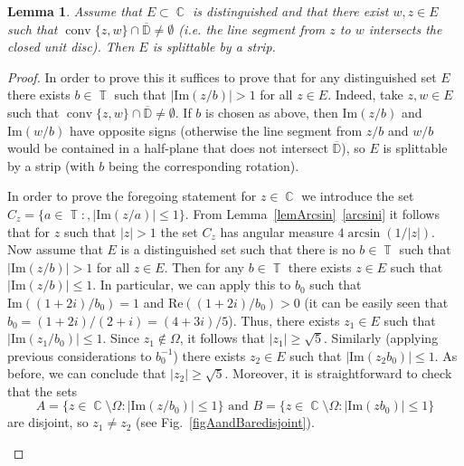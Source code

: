 \documentclass{amsart}
\numberwithin{equation}{section}
\newtheorem{lemma}[theorem]{Lemma}
\theoremstyle{definition}
\theoremstyle{remark}
\DeclareMathOperator{\conv}{conv}
\DeclareMathOperator{\CC}{\mathbb C}
\DeclareMathOperator{\TT}{\mathbb T}
\begin{document}
	\begin{lemma}\label{lemIfNotAsteriskThenNoOppositeStrips}
		Assume that $E \subset \CC$ is distinguished and that there exist $w,z \in E$ such that $\conv\{z, w\} \cap \overline{\mathbb D} \ne \emptyset$ (i.e. the line segment from $z$ to $w$ intersects the closed unit disc). Then $E$ is splittable by a strip.
	\end{lemma}
	\begin{proof}
		In order to prove this it suffices to prove that for any distinguished set $E$ there exists $b \in \TT$ such that $|\mathrm{Im}(z/b)| > 1$ for all $z \in E$.
		Indeed, take $z,w \in E$ such that $\conv\{z, w\} \cap \overline{\mathbb D} \ne \emptyset$. If $b$ is chosen as above, then $ \mathrm{Im}(z/b)$ and $\mathrm{Im}(w/b)$ have opposite signs (otherwise the line segment from $z/b$ and $w/b$ would be contained in a half-plane that does not intersect $\overline{\mathbb D}$), so $E$ is splittable by a strip (with $b$ being the corresponding rotation).
		
		In order to prove the foregoing statement for $z \in \CC$ we introduce the set $C_z = \{a \in \TT:, |\mathrm{Im}(z/a)| \le 1\}$. From Lemma~\ref{lemArcsin}~\ref{arcsini} it follows that for $z$ such that $|z| > 1$ the set $C_z$ has angular measure $4\arcsin(1/|z|)$. Now assume that $E$ is a distinguished set such that there is no $b \in \TT$ such that  $|\mathrm{Im}(z/b)| > 1$ for all $z \in E$. Then for any $b \in \TT$ there exists $z \in E$ such that $|\mathrm{Im}(z/b)| \le 1$. In particular, we can apply this to $b_0$ such that $\mathrm{Im}((1 + 2i)/b_0) = 1$ and $\mathrm{Re}((1 + 2i)/b_0) > 0$ (it can be easily seen that $b_0 = (1 + 2i)/(2 + i) = (4 + 3i)/5$). Thus, there exists $z_1 \in E$ such that $|\mathrm{Im}(z_1/b_0)| \le 1$. Since $z_1 \notin \Omega$, it follows that $|z_1| \ge \sqrt{5}$. Similarly (applying previous considerations to $b_0^{-1}$) there exists $z_2 \in E$ such that $|\mathrm{Im}(z_2b_0)| \le 1$. As before, we can conclude that $|z_2| \ge \sqrt{5}$. Moreover, it is straightforward to check that the sets
		\begin{equation}\label{eqAandB}
		A  = \{z \in \CC \setminus \Omega: |\mathrm{Im}(z/b_0)| \le 1\} \text{ and } B  = \{z \in \CC \setminus \Omega: |\mathrm{Im}(zb_0)| \le 1\} 
		\end{equation}
		are disjoint, so $z_1 \ne z_2$ (see Fig.~\ref{figAandBaredisjoint}).
		\begin{figure}
\end{figure}
\end{proof}
\end{document}
